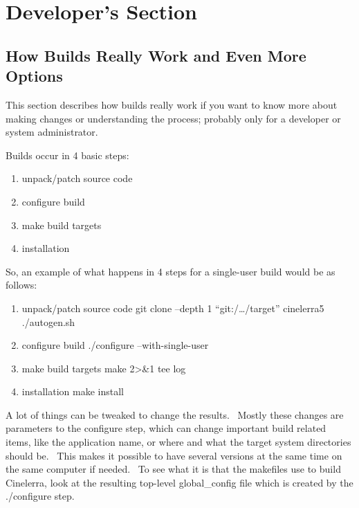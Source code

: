 \chapter{Developer's Section}%
\label{cha:Developer's_Section}

\section{How Builds Really Work and Even More Options}
\label{sec:How Builds Really Work and Even More Options}

This section describes how builds really work if you want to know more about making changes or understanding the process; probably only for a developer or system administrator.
\medskip

Builds occur in 4 basic steps:
\smallskip
\begin{enumerate}[nosep]
	\item unpack/patch source code
	\item configure build
	\item make build targets
	\item installation
\end{enumerate}

So, an example of what happens in 4 steps for a single-user build would be as follows:
\smallskip

\begin{enumerate}[nosep]
	\item unpack/patch source code\newline
	git clone --depth 1 ``git:/{\dots}/target'' cinelerra5\newline
	./autogen.sh
	\item configure build\newline
	./configure --with-single-user
	\item make build targets\newline
	make 2{\textgreater}\&1 {\textbar} tee log
	\item installation\newline
	make install
\end{enumerate}
\medskip

A lot of things can be tweaked to change the results. \ Mostly these changes are parameters to the configure step, which can change important build related items, like the application name, or where and what the target system directories should be. \ This makes it possible to have several versions at the same time on the same computer if needed. \ To see what it is that the makefiles use to build Cinelerra, look at the resulting top-level global\_config file which is created by the ./configure step.
\medskip

